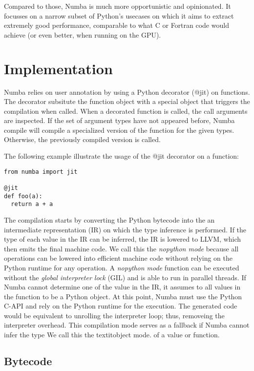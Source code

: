 \documentclass{acm_proc_article-sp}
\begin{document}
Compared to those, Numba is much more opportunistic and opinionated.
It focusses on a narrow subset of Python's usecases on which it
aims to extract extremely good performance, comparable to what C or Fortran
code would achieve (or even better, when running on the GPU).


\section{Implementation}

Numba relies on user annotation by using a Python decorator (@jit) on functions.
The decorator subsitute the function object with a special object that triggers
the compilation when called. When a decorated function is called,
the call arguments are inspected. If the set of argument types have not appeared
before, Numba compile will compile a specialized version of the function for the
given types. Otherwise, the previously compiled version is called.

The following example illustrate the usage of the @jit decorator on a function:


\begin{lstlisting}
from numba import jit

@jit
def foo(a):
  return a + a
\end{lstlisting}

The compilation starts by converting the Python bytecode into the an
intermediate representation (IR) on which the type inference
is performed. If the type of each value in the IR can be inferred, the IR is
lowered to LLVM, which then emits the final machine code.  We call this the
\textit{nopython mode} because all operations can be lowered into efficient
machine code without relying on the Python runtime for any operation.
A \textit{nopython mode} function can be executed without the \textit{global
interpreter lock} (GIL) and is able to run in parallel threads.
If Numba cannot determine one of the value in the IR,
it assumes to all values in the function to be a Python object. At this point,
Numba must use the Python C-API and rely on the Python runtime for the
execution. The generated code would be equivalent to unrolling the interpreter
loop; thus, removeing the interpreter overhead.
This compilation mode serves as a fallback if Numba cannot infer the type
We call this the textit{object mode}.
of a value or function.

\subsection{Bytecode}
\end{document}
